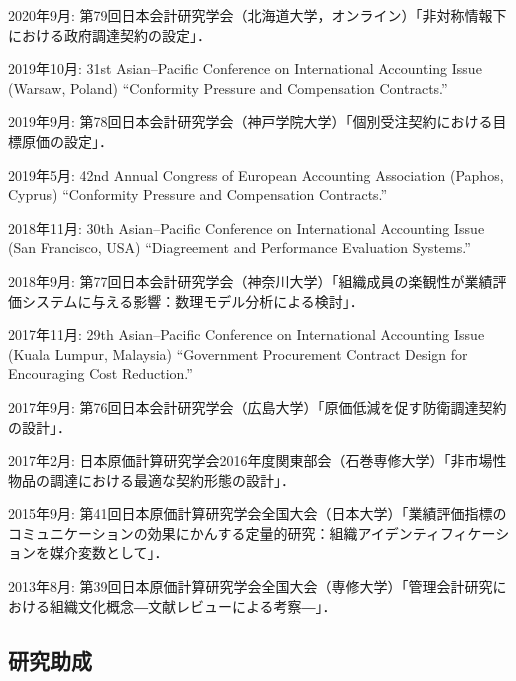 \documentclass[letterpaper,uplatex]{article}
\renewenvironment{itemize}{
  \begin{list}{}{
    \setlength{\leftmargin}{1.5em}
  }
}{
  \end{list}
}
\begin{document}
\begin{itemize}
  \item 2020年9月: 第79回日本会計研究学会（北海道大学，オンライン）「非対称情報下における政府調達契約の設定」．
  
  \item 2019年10月: 31st Asian--Pacific Conference on International Accounting Issue (Warsaw, Poland) ``Conformity Pressure and Compensation Contracts.''

  \item 2019年9月: 第78回日本会計研究学会（神戸学院大学）「個別受注契約における目標原価の設定」．

  \item 2019年5月: 42nd Annual Congress of European Accounting Association (Paphos, Cyprus) ``Conformity Pressure and Compensation Contracts.''

  \item 2018年11月: 30th Asian--Pacific Conference on International Accounting Issue (San Francisco, USA) ``Diagreement and Performance Evaluation Systems.''

  \item 2018年9月: 第77回日本会計研究学会（神奈川大学）「組織成員の楽観性が業績評価システムに与える影響：数理モデル分析による検討」．

	\item 2017年11月: 29th Asian--Pacific Conference on International Accounting Issue (Kuala Lumpur, Malaysia) ``Government Procurement Contract Design for Encouraging Cost Reduction.''

	\item 2017年9月: 第76回日本会計研究学会（広島大学）「原価低減を促す防衛調達契約の設計」．

	\item 2017年2月: 日本原価計算研究学会2016年度関東部会（石巻専修大学）「非市場性物品の調達における最適な契約形態の設計」．

	\item 2015年9月: 第41回日本原価計算研究学会全国大会（日本大学）「業績評価指標のコミュニケーションの効果にかんする定量的研究：組織アイデンティフィケーションを媒介変数として」．

	\item 2013年8月: 第39回日本原価計算研究学会全国大会（専修大学）「管理会計研究における組織文化概念―文献レビューによる考察―」．
\end{itemize}

\subsection*{研究助成}
\end{document}
